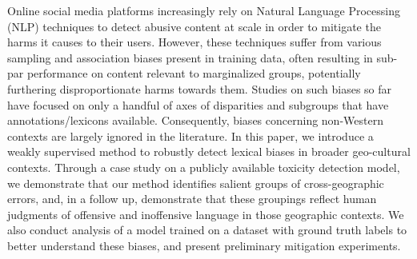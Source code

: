 Online social media platforms increasingly rely on Natural Language Processing (NLP) techniques to detect abusive content at scale in order to mitigate the harms it causes to their users. However, these techniques suffer from various sampling and association biases present in training data, often resulting in sub-par performance on content relevant to marginalized groups, potentially furthering disproportionate harms towards them. Studies on such biases so far have focused on only a handful of axes of disparities and subgroups that have annotations/lexicons available. Consequently, biases concerning non-Western contexts are largely ignored in the literature. In this paper, we introduce a weakly supervised method to robustly detect lexical biases in broader geo-cultural contexts. Through a case study on a publicly available toxicity detection model, we demonstrate that our method identifies salient groups of cross-geographic errors, and, in a follow up, demonstrate that these groupings reflect human judgments of offensive and inoffensive language in those geographic contexts. We also conduct analysis of a model trained on a dataset with ground truth labels to better understand these biases, and present preliminary mitigation experiments.
